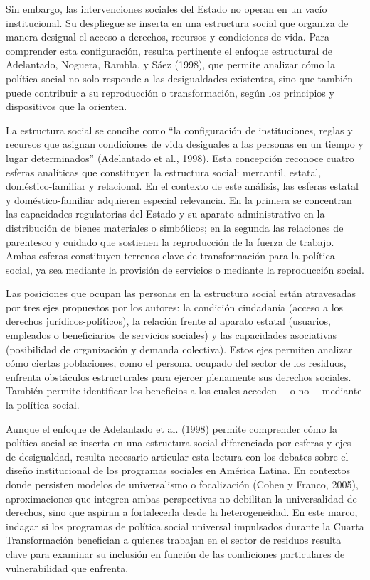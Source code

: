 \documentclass[
  spanish,
  11.5pt,
  170mm x 240mmpaper,
]{scrbook}
\begin{document}
Sin embargo, las intervenciones sociales del Estado no operan en un
vacío institucional. Su despliegue se inserta en una estructura social
que organiza de manera desigual el acceso a derechos, recursos y
condiciones de vida. Para comprender esta configuración, resulta
pertinente el enfoque estructural de Adelantado, Noguera, Rambla, y Sáez
(1998), que permite analizar cómo la política social no solo responde a
las desigualdades existentes, sino que también puede contribuir a su
reproducción o transformación, según los principios y dispositivos que
la orienten.

La estructura social se concibe como ``la configuración de
instituciones, reglas y recursos que asignan condiciones de vida
desiguales a las personas en un tiempo y lugar determinados''
(Adelantado et al., 1998). Esta concepción reconoce cuatro esferas
analíticas que constituyen la estructura social: mercantil, estatal,
doméstico-familiar y relacional. En el contexto de este análisis, las
esferas estatal y doméstico-familiar adquieren especial relevancia. En
la primera se concentran las capacidades regulatorias del Estado y su
aparato administrativo en la distribución de bienes materiales o
simbólicos; en la segunda las relaciones de parentesco y cuidado que
sostienen la reproducción de la fuerza de trabajo. Ambas esferas
constituyen terrenos clave de transformación para la política social, ya
sea mediante la provisión de servicios o mediante la reproducción
social.

Las posiciones que ocupan las personas en la estructura social están
atravesadas por tres ejes propuestos por los autores: la condición
ciudadanía (acceso a los derechos jurídicos-políticos), la relación
frente al aparato estatal (usuarios, empleados o beneficiarios de
servicios sociales) y las capacidades asociativas (posibilidad de
organización y demanda colectiva). Estos ejes permiten analizar cómo
ciertas poblaciones, como el personal ocupado del sector de los
residuos, enfrenta obstáculos estructurales para ejercer plenamente sus
derechos sociales. También permite identificar los beneficios a los
cuales acceden ---o no--- mediante la política social.

Aunque el enfoque de Adelantado et al. (1998) permite comprender cómo la
política social se inserta en una estructura social diferenciada por
esferas y ejes de desigualdad, resulta necesario articular esta lectura
con los debates sobre el diseño institucional de los programas sociales
en América Latina. En contextos donde persisten modelos de universalismo
o focalización (Cohen y Franco, 2005), aproximaciones que integren ambas
perspectivas no debilitan la universalidad de derechos, sino que aspiran
a fortalecerla desde la heterogeneidad. En este marco, indagar si los
programas de política social universal impulsados durante la Cuarta
Transformación benefician a quienes trabajan en el sector de residuos
resulta clave para examinar su inclusión en función de las condiciones
particulares de vulnerabilidad que enfrenta.
\end{document}
